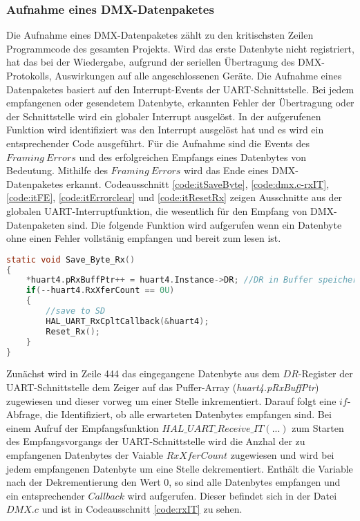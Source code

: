 
\subsubsection{Aufnahme eines DMX-Datenpaketes}
Die Aufnahme eines DMX-Datenpaketes zählt zu den kritischsten Zeilen Programmcode des gesamten Projekts. Wird das erste Datenbyte nicht registriert, hat das bei der Wiedergabe, aufgrund der seriellen Übertragung des DMX-Protokolls, Auswirkungen auf alle angeschlossenen Geräte. 
Die Aufnahme eines Datenpaketes basiert auf den Interrupt-Events der UART-Schnittstelle. Bei jedem empfangenen oder gesendetem Datenbyte, erkannten Fehler der Übertragung oder der Schnittstelle wird ein globaler Interrupt ausgelöst. In der aufgerufenen Funktion wird identifiziert was den Interrupt ausgelöst hat und es wird ein entsprechender Code ausgeführt. Für die Aufnahme sind die Events des $Framing\ Errors$ und des erfolgreichen Empfangs eines Datenbytes von Bedeutung. Mithilfe des $Framing\ Errors$ wird das Ende eines DMX-Datenpaketes erkannt. Codeausschnitt \ref{code:itSaveByte}, \ref{code:dmx.c-rxIT}, \ref{code:itFE}, \ref{code:itErrorclear} und \ref{code:itResetRx} zeigen Ausschnitte aus der globalen UART-Interruptfunktion, die wesentlich für den Empfang von DMX-Datenpaketen sind. Die folgende Funktion wird aufgerufen wenn ein Datenbyte ohne einen Fehler vollstänig empfangen und bereit zum lesen ist. 
\begin{lstlisting}[caption = stm32f4xx\_it.c: UART Save\_Byte\_Rx(),
label = code:itSaveByte, 
language = C, 
firstnumber = 442]
static void Save_Byte_Rx()
{
	*huart4.pRxBuffPtr++ = huart4.Instance->DR; //DR in Buffer speichern
	if(--huart4.RxXferCount == 0U)
	{
		//save to SD
		HAL_UART_RxCpltCallback(&huart4);
		Reset_Rx();
	}
}
\end{lstlisting}
Zunächst wird in Zeile 444 das eingegangene Datenbyte aus dem $DR$-Register der UART-Schnittstelle dem Zeiger auf das Puffer-Array (\textit{huart4.pRxBuffPtr}) zugewiesen und dieser vorweg um einer Stelle inkrementiert. %
Darauf folgt eine $if$-Abfrage, die Identifiziert, ob alle erwarteten Datenbytes empfangen sind. Bei einem Aufruf der Empfangsfunktion $HAL\_UART\_Receive\_IT(...)$ zum Starten des Empfangsvorgangs der UART-Schnittstelle wird die Anzhal der zu empfangenen Datenbytes der Vaiable $RxXferCount$ zugewiesen und wird bei jedem empfangenen Datenbyte um eine Stelle dekrementiert. Enthält die Variable nach der Dekrementierung den Wert 0, so sind alle Datenbytes empfangen und ein entsprechender $Callback$ wird aufgerufen. Dieser befindet sich in der Datei $DMX.c$ und ist in Codeausschnitt \ref{code:rxIT} zu sehen. 
